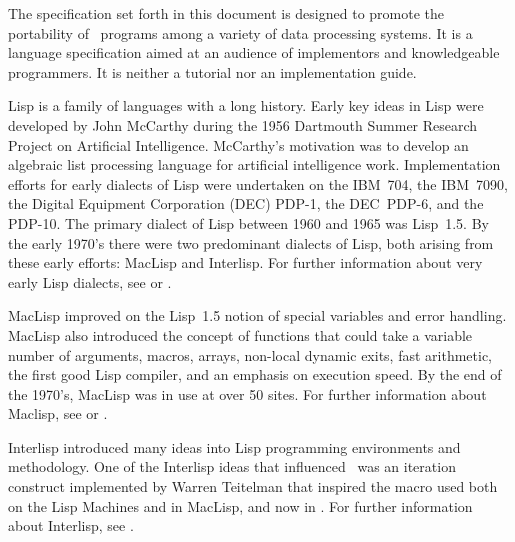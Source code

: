 The specification set forth in this document is designed to promote
the portability of \clisp\ programs among a variety of data processing
systems. It is a language specification aimed at an audience of
implementors and knowledgeable programmers. It is neither a tutorial nor
an implementation guide.
\endsubSection%

 
Lisp is a family of languages with a long history.  Early key ideas in
Lisp were developed by John McCarthy during the 1956 Dartmouth Summer
Research Project on Artificial Intelligence.  McCarthy's motivation
was to develop an algebraic list processing language for artificial
intelligence work.
Implementation efforts for early dialects of Lisp were undertaken on
the IBM~704, the IBM~7090, the Digital Equipment Corporation (DEC) PDP-1,
the DEC~PDP-6, and the PDP-10. The primary dialect of Lisp between
1960 and 1965 was Lisp~1.5. By the early 1970's there were two
predominant dialects of Lisp, both arising from these early efforts:
MacLisp and Interlisp.
For further information about very early Lisp dialects, 
see {\AnatomyOfLisp} or {\LispOnePointFive}.
 
MacLisp improved on the Lisp~1.5 notion of special variables and error
handling. MacLisp also introduced the concept of functions that could take
a variable number of arguments, macros, arrays, non-local dynamic
exits, fast arithmetic, the first good Lisp compiler, and an emphasis
on execution speed. 
By the end of the 1970's, MacLisp was in use at over 50 sites.
For further information about Maclisp, 
see {\Moonual} or {\Pitmanual}.
 
Interlisp introduced many ideas into Lisp programming environments and
methodology. One of the Interlisp ideas that influenced \clisp\ was an iteration
construct implemented by Warren Teitelman that inspired the 
macro used both on the Lisp Machines and in MacLisp, and now in \clisp.
For further information about Interlisp,
see {\InterlispManual}.
 
